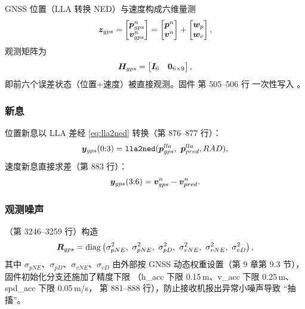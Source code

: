 GNSS 位置（LLA 转换 NED）与速度构成六维量测
\begin{equation}
  \boldsymbol{z}_{gps} = \begin{bmatrix} \boldsymbol{p}^n_{gps} \\ \boldsymbol{v}^n_{gps} \end{bmatrix}
  = \begin{bmatrix} \boldsymbol{p}^n \\ \boldsymbol{v}^n \end{bmatrix}
    + \begin{bmatrix} \boldsymbol{w}_p \\ \boldsymbol{w}_v \end{bmatrix},
  \label{eq:gnss-meas}
\end{equation}
观测矩阵为
\begin{equation}
  \boldsymbol{H}_{gps} = \begin{bmatrix} \boldsymbol{I}_6 & \boldsymbol{0}_{6\times9} \end{bmatrix},
  \label{eq:H-gnss}
\end{equation}
即前六个误差状态（位置+速度）被直接观测。固件  第 505--506 行
一次性写入 。

\subsubsection{新息}

位置新息以 LLA 差经 \cref{eq:lla2ned} 转换（第 876--877 行）：
\begin{equation}
  \boldsymbol{y}_{gps}(0{:}3) = \texttt{lla2ned}(\boldsymbol{p}_{gps}^{lla},\ \boldsymbol{p}_{pred}^{lla},
    RAD),
  \label{eq:y-gnss-pos}
\end{equation}
速度新息直接求差（第 883 行）：
\begin{equation}
  \boldsymbol{y}_{gps}(3{:}6) = \boldsymbol{v}^n_{gps} - \boldsymbol{v}^n_{pred}.
  \label{eq:y-gnss-vel}
\end{equation}

\subsubsection{观测噪声}

（第 3246--3259 行）构造
\begin{equation}
  \boldsymbol{R}_{gps} = \operatorname{diag}\left(\sigma_{pNE}^2,\ \sigma_{pNE}^2,\ \sigma_{pD}^2,\
    \sigma_{vNE}^2,\ \sigma_{vNE}^2,\ \sigma_{vD}^2\right),
  \label{eq:R-gnss}
\end{equation}
其中 $\sigma_{pNE}$、$\sigma_{pD}$、$\sigma_{vNE}$、$\sigma_{vD}$ 由外部按
GNSS 动态权重设置（第 9 章第 9.3 节），固件初始化分支还施加了精度下限
（h\_acc 下限 0.15\,m、v\_acc 下限 0.25\,m、spd\_acc 下限 0.05\,m/s，
 第 881--888 行），防止接收机报出异常小噪声导致
``抽搐''。

